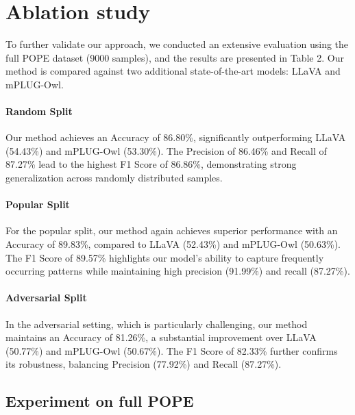 \section{Ablation study}

To further validate our approach, we conducted an extensive evaluation using the full POPE dataset (9000 samples), and the results are presented in Table 2. Our method is compared against two additional state-of-the-art models: LLaVA and mPLUG-Owl.

\vspace{-4pt}
\paragraph{Random Split}

Our method achieves an Accuracy of 86.80\%, significantly outperforming LLaVA (54.43\%) and mPLUG-Owl (53.30\%). The Precision of 86.46\% and Recall of 87.27\% lead to the highest F1 Score of 86.86\%, demonstrating strong generalization across randomly distributed samples.

\vspace{-4pt}
\paragraph{Popular Split}

For the popular split, our method again achieves superior performance with an Accuracy of 89.83\%, compared to LLaVA (52.43\%) and mPLUG-Owl (50.63\%). The F1 Score of 89.57\% highlights our model’s ability to capture frequently occurring patterns while maintaining high precision (91.99\%) and recall (87.27\%).

\vspace{-4pt}
\paragraph{Adversarial Split}

In the adversarial setting, which is particularly challenging, our method maintains an Accuracy of 81.26\%, a substantial improvement over LLaVA (50.77\%) and mPLUG-Owl (50.67\%). The F1 Score of 82.33\% further confirms its robustness, balancing Precision (77.92\%) and Recall (87.27\%).

\subsection{Experiment on full POPE}

